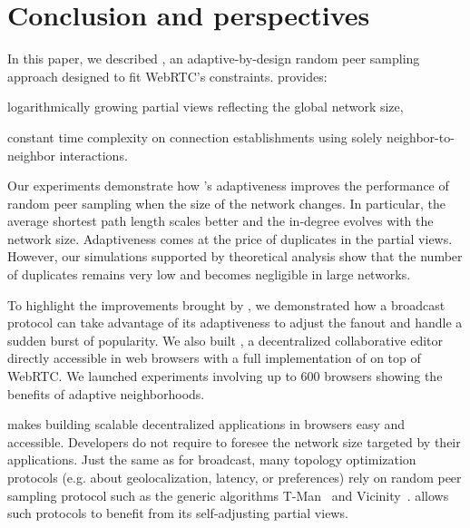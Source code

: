 
\section{Conclusion and perspectives}
\label{sec:conclusion}



In this paper, we described \SPRAY, an adaptive-by-design random peer sampling
approach designed to fit WebRTC's constraints.  \SPRAY provides:
\begin{inparaenum}[(i)]
\item logarithmically growing partial views reflecting the global network size,
\item constant time complexity on connection establishments using solely
  neighbor-to-neighbor interactions.
\end{inparaenum}
Our experiments demonstrate how \SPRAY's adaptiveness improves the performance
of random peer sampling when the size of the network changes. In particular, the
average shortest path length scales better and the in-degree evolves with the
network size.
Adaptiveness comes at the price of duplicates in the partial views. However, our
simulations supported by theoretical analysis show that the number of duplicates
remains very low and becomes negligible in large networks.

To highlight the improvements brought by \SPRAY, we demonstrated how a
broadcast protocol can take advantage of its adaptiveness to adjust
the fanout and handle a sudden burst of popularity. We also built
\CRATE, a decentralized collaborative editor directly accessible in
web browsers with a full implementation of \SPRAY on top of WebRTC. We
launched experiments involving up to 600 browsers showing the %
benefits of adaptive neighborhoods.

\SPRAY makes building scalable decentralized applications in browsers
easy and accessible.  Developers do not require to foresee the network
size targeted by their applications. Just the same as for broadcast,
many topology optimization protocols (e.g. about geolocalization,
latency, or preferences) rely on random peer sampling protocol such as
the generic algorithms T-Man~\cite{jelasity2009tman} and
Vicinity~\cite{voulgaris2005epidemic}. \SPRAY allows such protocols to
benefit from its self-adjusting partial views.

